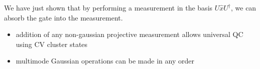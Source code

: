 \documentclass[reprint,
superscriptaddress,
 amsmath,amssymb,
 aps,
prb,
]{revtex4-1}
\begin{document}
We have just shown that 
by performing a measurement in the basis $U\hat x U^\dagger$, we can absorb the gate into the measurement. 

\begin{itemize}
	\item addition of any non-gaussian projective measurement allows universal QC using CV cluster states
	\item multimode Gaussian operations can be made in any order
\end{itemize}





\begin{eqnarray}
\end{eqnarray}
\end{document}

